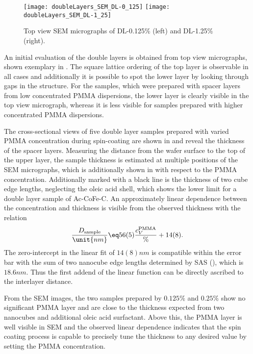 \documentclass[\main/dresen_thesis.tex]{subfiles}
\begin{document}
  \label{sec:doublelayers:layers:sem}

  \begin{figure}[tb]
    \centering
    \texttt{[image: doubleLayers\_SEM\_DL-0\_125]}
    \texttt{[image: doubleLayers\_SEM\_DL-1\_25]}
    \caption{\label{fig:doublelayers:layers:sem}Top view SEM micrographs of DL-0.125\% (left) and DL-1.25\% (right).}
  \end{figure}

  An initial evaluation of the double layers is obtained from top view micrographs, shown exemplary in .
  The square lattice ordering of the top layer is observable in all cases and additionally it is possible to spot the lower layer by looking through gaps in the structure.
  For the samples, which were prepared with spacer layers from low concentrated PMMA dispersions, the lower layer is clearly visible in the top view micrograph, whereas it is less visible for samples prepared with higher concentrated PMMA dispersions.

  The cross-sectional views of five double layer samples prepared with varied PMMA concentration during spin-coating are shown in  and reveal the thickness of the spacer layers.
  Measuring the distance from the wafer surface to the top of the upper layer, the sample thickness is estimated at multiple positions of the SEM micrographs, which is additionally shown in  with respect to the PMMA concentration.
  Additionally marked with a black line is the thickness of two cube edge lengths, neglecting the oleic acid shell, which shows the lower limit for a double layer sample of Ac-CoFe-C.
  An approximately linear dependence between the concentration and thickness is visible from the observed thickness with the relation
  \begin{align}
    \frac{D_\mathrm{sample}}{\unit{nm}} \eq 56(5) \frac{c_V^\mathrm{PMMA}}{\%}  + 14(8).
  \end{align}
  The zero-intercept in the linear fit of $14(8) \unit{nm}$ is compatible within the error bar with the sum of two nanocube edge lengths determined by SAS (), which is $18.6 \unit{nm}$.
  Thus the first addend of the linear function can be directly ascribed to the interlayer distance.

  From the SEM images, the two samples prepared by $0.125 \%$ and $0.25\%$ show no significant PMMA layer and are close to the thickness expected from two nanocubes and additional oleic acid surfactant.
  Above this, the PMMA layer is well visible in SEM and the observed linear dependence indicates that the spin coating process is capable to precisely tune the thickness to any desired value by setting the PMMA concentration.
\end{document}

